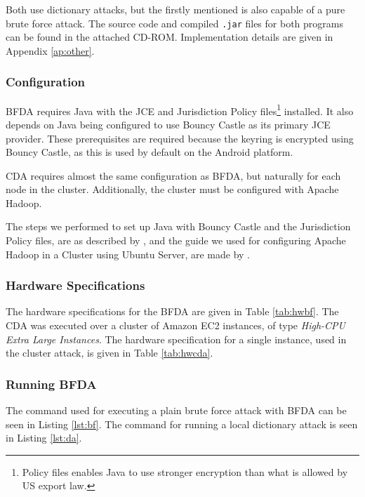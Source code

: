 \documentclass[pdftex,english,10pt,b5paper,twoside]{book}
\begin{document}
Both use dictionary attacks, but the firstly mentioned is also capable of a
pure brute force attack. The source code and compiled \texttt{.jar} files for
both programs can be found in the attached CD-ROM. Implementation details are
given in Appendix \ref{ap:other}.

\subsubsection{Configuration}

\ac{BFDA} requires Java with the \ac{JCE} and Jurisdiction Policy
files\footnote{Policy files enables Java to use stronger encryption than what
is allowed by US export law.} installed. It also depends on Java being
configured to use Bouncy Castle as its primary \ac{JCE} provider. These
prerequisites are required because the keyring is encrypted using Bouncy
Castle, as this is used by default on the Android platform.

\ac{CDA} requires almost the same configuration as \ac{BFDA}, but naturally for
each node in the cluster. Additionally, the cluster must be configured with
Apache Hadoop.

The steps we performed to set up Java with Bouncy Castle and the Jurisdiction
Policy files, are as described by \citet{jce+bc}, and the guide we used for
configuring Apache Hadoop in a Cluster using Ubuntu Server, are made by
\citet{cluster}.

\subsubsection{Hardware Specifications}

The hardware specifications for the \acl{BFDA} are given in Table
\ref{tab:hwbf}. The \acl{CDA} was executed over a cluster of Amazon \ac{EC2}
instances, of type \emph{High-CPU Extra Large Instances}. The hardware
specification for a single instance, used in the cluster attack, is given in
Table \ref{tab:hwcda}.




\subsubsection{Running \ac{BFDA}}

The command used for executing a plain brute force attack with \ac{BFDA} can be
seen in Listing \ref{lst:bf}. The command for running a local dictionary attack
is seen in Listing \ref{lst:da}.
\end{document}
